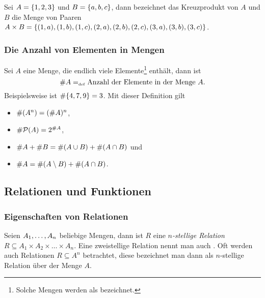 \begin{example}
Sei $A = \{1, 2, 3\}$ und $B = \{a, b, c\}$, dann bezeichnet das
Kreuzprodukt von $A$ und $B$ die Menge von Paaren $A \times B =
\{(1,a), (1,b), (1,c), (2,a), (2,b), (2,c),\allowbreak (3,\allowbreak a), (3,b), (3,c)\}$.
\end{example}

\subsubsection{Die Anzahl von Elementen in Mengen}
\label{cntSet}
Sei $A$ eine Menge, die endlich viele Elemente\footnote{Solche Mengen
werden als  bezeichnet.}
enthält, dann ist
\begin{displaymath}
\# A =_{\mathrm{\scriptscriptstyle def}} \text{Anzahl der Elemente in der Menge $A$}.
\end{displaymath}
\noindent Beispielsweise ist $\# \{4,7,9\} = 3$. Mit dieser Definition gilt

\begin{itemize}
%
\item $\#(A^n) = (\# A)^n$\index{$\cnt$},
%
\item $\# \mathcal{P}(A) = 2^{\# A}$,
%
\item $\# A + \# B = \#(A \cup B) + \# (A \cap B)$ und
%
\item $\# A = \# (A \setminus B) + \#(A \cap B)$.
%
\end{itemize}

\subsection{Relationen und Funktionen}

\subsubsection{Eigenschaften von Relationen}
\label{PropRel}

Seien ${A_{1}}, \allowbreak \dots , \allowbreak{A_{n}}$ beliebige Mengen, dann ist $R$ eine
\emph{$n$-stellige Relation} \gdw 
\ $R \subseteq A_1 \times A_2 \times \dots \times A_n$. Eine
zweistellige Relation nennt man auch . Oft werden auch Relationen
$R \subseteq A^n$ betrachtet, diese bezeichnet man dann als
$n$-stellige Relation über der Menge $A$.


